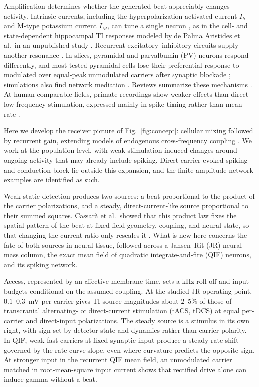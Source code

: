\documentclass[a4paper]{article}
\begin{document}
Amplification determines whether the generated beat appreciably changes activity.
Intrinsic currents, including the hyperpolarization-activated current $I_h$ and
M-type potassium current $I_M$, can tune a single neuron \cite{hutcheonyarom2000},
as in the cell- and state-dependent hippocampal TI responses modeled by de Palma
Aristides et al.\ in an unpublished study \cite{depalma2026ti}. Recurrent excitatory--inhibitory circuits supply another
resonance \cite{brunelhakim1999,brunelwang2003,ledoux2011}. In slices, pyramidal and
parvalbumin (PV) neurons respond differently, and most tested pyramidal cells
lose their preferential response to modulated over equal-peak unmodulated
carriers after synaptic blockade \cite{caldas2024}; simulations also find network
mediation \cite{karimi2024,esmaeilpour2021}. Reviews summarize these mechanisms
\cite{soroushi2025,wangw2026}. At human-comparable fields, primate recordings show
weaker effects than direct low-frequency stimulation, expressed mainly in spike
timing rather than mean rate \cite{vieira2024}.

Here we develop the receiver picture of Fig.~\ref{fig:concept}: cellular mixing followed
by recurrent gain, extending models of endogenous cross-frequency coupling
\cite{ruffini2025cfc,ruffini2025ham}. We work at the population level, with weak
stimulation-induced changes around ongoing activity that may already include spiking.
Direct carrier-evoked spiking and conduction block
\cite{opancar2025,peripheral2023,semenov2025} lie outside this expansion, and the
finite-amplitude network examples are identified as such.

Weak static detection produces two sources: a beat proportional to the product of the
carrier polarizations, and a steady, direct-current-like source proportional to their
summed squares. Cassar\`a et al.\ showed that this product law fixes the spatial
pattern of the beat at fixed field geometry, coupling, and neural state, so that
changing the current ratio only rescales it \cite{cassara2025part2}. What is new here concerns the fate of both sources in neural
tissue, followed across a Jansen--Rit (JR) neural mass column, the exact mean field of
quadratic integrate-and-fire (QIF) neurons, and its spiking network. 

Access, represented
by an effective membrane time, sets a kHz roll-off and input budgets conditional on the
assumed coupling. At the studied JR operating point, $0.1$--$0.3$~mV per carrier gives
TI source magnitudes about $2$--$5\%$ of those of transcranial alternating- or
direct-current stimulation (tACS, tDCS) at equal per-carrier and direct-input polarizations. The steady source is a stimulus in its own right, with sign set by detector state
and dynamics rather than carrier polarity. In QIF, weak fast carriers at fixed
synaptic input produce a steady rate shift governed by the rate-curve slope, even
where curvature predicts the opposite sign. At stronger input in the recurrent QIF
mean field, an unmodulated carrier matched in root-mean-square input current shows
that rectified drive alone can induce gamma without a beat. 
\end{document}
